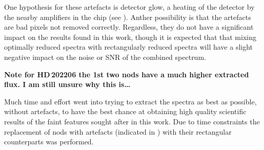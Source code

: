 One hypothesis for these artefacts is detector glow, a heating of the detector by the nearby amplifiers in the chip (see ).
Anther possibility is that the artefacts are bad pixels not removed correctly.
Regardless, they do not have a significant impact on the results found in this work, though it is expected that that mixing optimally reduced spectra with rectangularly reduced spectra will have a slight negative impact on the noise or SNR of the combined spectrum.

\textbf{Note for HD\,202206 the 1st two nods have a much higher extracted flux. I am still unsure why this is\ldots{}}


Much time and effort went into trying to extract the spectra as best as possible, without artefacts, to have the best chance at obtaining high quality scientific results of the faint features sought after in this work.
Due to time constraints the replacement of nods with artefacts (indicated in ) with their rectangular counterparts was performed.

